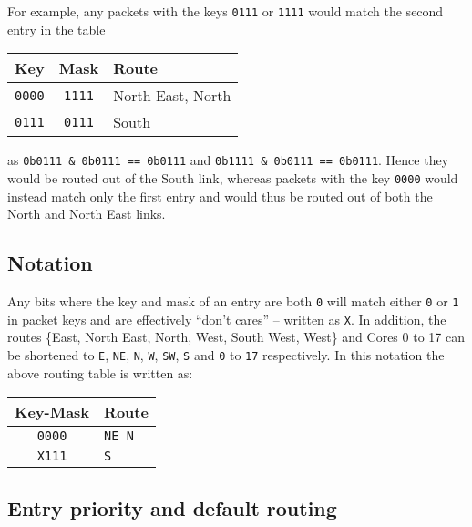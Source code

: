 \documentclass[conference]{IEEEtran}
\newcommand{\mytt}[1]{\texttt{\footnotesize#1}}
\begin{document}
  For example, any packets with the keys \mytt{0111} or \mytt{1111} would match the second entry in the table

  \begin{table}[H]
    \centering
    \begin{tabular}{c c l}
      \toprule
      Key & Mask & Route \\
      \midrule
      \texttt{0000} & \texttt{1111} & North East, North \\
      \texttt{0111} & \texttt{0111} & South \\
      \bottomrule
    \end{tabular}
  \end{table}

  \noindent as \mytt{0b0111 \& 0b0111 == 0b0111} and \mytt{0b1111 \& 0b0111 == 0b0111}.
  Hence they would be routed out of the South link, whereas packets with the key \mytt{0000} would instead match only the first entry and would thus be routed out of both the North and North East links.

  \subsection{Notation}

  Any bits where the key and mask of an entry are both \mytt{0} will match either \mytt{0} or \mytt{1} in packet keys and are effectively ``don't cares'' -- written as \mytt{X}.
  In addition, the routes \{East, North East, North, West, South West, West\} and Cores 0 to 17 can be shortened to \mytt{E}, \mytt{NE}, \mytt{N}, \mytt{W}, \mytt{SW}, \mytt{S} and \mytt{0} to \mytt{17} respectively.
  In this notation the above routing table is written as:

  \begin{table}[H]
    \centering
    \begin{tabular}{c l}
      \toprule
      Key-Mask & Route \\
      \midrule
      \texttt{0000} & \texttt{NE N}\\
      \texttt{X111} & \texttt{S}\\
      \bottomrule
    \end{tabular}
  \end{table}

  \subsection{Entry priority and default routing}
\end{document}
